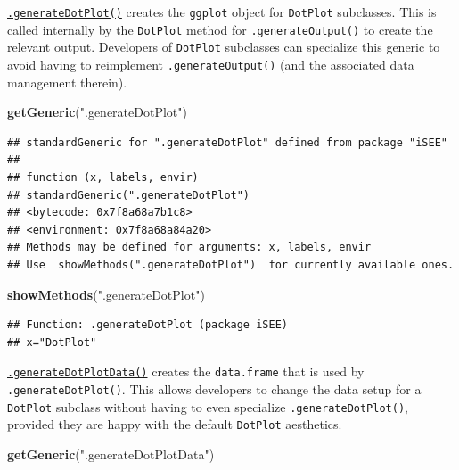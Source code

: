 \documentclass[
]{book}
\newenvironment{Shaded}{\begin{snugshade}}{\end{snugshade}}
\newcommand{\KeywordTok}[1]{\textcolor[rgb]{0.13,0.29,0.53}{\textbf{#1}}}
\newcommand{\NormalTok}[1]{#1}
\newcommand{\StringTok}[1]{\textcolor[rgb]{0.31,0.60,0.02}{#1}}
\begin{document}
\href{https://isee.github.io/iSEE/reference/plot-generics.html}{\texttt{.generateDotPlot()}} creates the \texttt{ggplot} object for \texttt{DotPlot} subclasses.
This is called internally by the \texttt{DotPlot} method for \texttt{.generateOutput()} to create the relevant output.
Developers of \texttt{DotPlot} subclasses can specialize this generic to avoid having to reimplement \texttt{.generateOutput()} (and the associated data management therein).

\begin{Shaded}
\begin{Highlighting}[]
\KeywordTok{getGeneric}\NormalTok{(}\StringTok{".generateDotPlot"}\NormalTok{)}
\end{Highlighting}
\end{Shaded}

\begin{verbatim}
## standardGeneric for ".generateDotPlot" defined from package "iSEE"
## 
## function (x, labels, envir) 
## standardGeneric(".generateDotPlot")
## <bytecode: 0x7f8a68a7b1c8>
## <environment: 0x7f8a68a84a20>
## Methods may be defined for arguments: x, labels, envir
## Use  showMethods(".generateDotPlot")  for currently available ones.
\end{verbatim}

\begin{Shaded}
\begin{Highlighting}[]
\KeywordTok{showMethods}\NormalTok{(}\StringTok{".generateDotPlot"}\NormalTok{)}
\end{Highlighting}
\end{Shaded}

\begin{verbatim}
## Function: .generateDotPlot (package iSEE)
## x="DotPlot"
\end{verbatim}

\href{https://isee.github.io/iSEE/reference/plot-generics.html}{\texttt{.generateDotPlotData()}} creates the \texttt{data.frame} that is used by \texttt{.generateDotPlot()}.
This allows developers to change the data setup for a \texttt{DotPlot} subclass without having to even specialize \texttt{.generateDotPlot()}, provided they are happy with the default \texttt{DotPlot} aesthetics.

\begin{Shaded}
\begin{Highlighting}[]
\KeywordTok{getGeneric}\NormalTok{(}\StringTok{".generateDotPlotData"}\NormalTok{)}
\end{Highlighting}
\end{Shaded}
\end{document}
